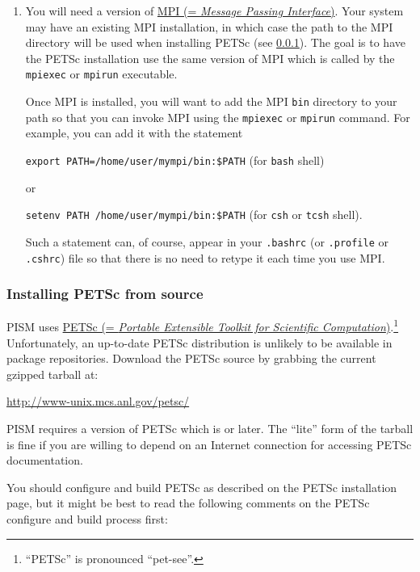 \documentclass[titlepage,letterpaper,final]{scrartcl}
\begin{document}
\begin{enumerate}
\item You will need a version of \href{http://www-unix.mcs.anl.gov/mpi/}{MPI (=
    \emph{Message Passing Interface})}. Your system may have an existing MPI installation, in which
  case the path to the MPI directory will be used when installing PETSc  (see \ref{subsec:prereq-petsc}).
  The goal is to have the PETSc installation use the
  same version of MPI which is called by the \texttt{mpiexec} or \texttt{mpirun}
  executable.

  Once MPI is installed, you will
  want to add the MPI \texttt{bin} directory to your path so that you can
  invoke MPI using the \texttt{mpiexec} or \texttt{mpirun} command. For
  example, you can add it with the statement

\texttt{export PATH=/home/user/mympi/bin:\$PATH}  \qquad (for \texttt{bash} shell)

\noindent or

\texttt{setenv PATH /home/user/mympi/bin:\$PATH}  \qquad (for \texttt{csh} or \texttt{tcsh} shell).

\noindent Such a statement can, of course, appear in your \texttt{.bashrc} (or
\texttt{.profile} or \texttt{.cshrc}) file so that there is no need to retype
it each time you use MPI.

\end{enumerate}


\subsubsection{Installing PETSc from source}
\label{subsec:prereq-petsc}
  
PISM uses \href{http://www-unix.mcs.anl.gov/petsc/}{PETSc (=
    \emph{Portable Extensible Toolkit for Scientific
      Computation})}.\footnote{``PETSc''
  is pronounced ``pet-see''.}  Unfortunately, an up-to-date PETSc distribution
  is unlikely to be available in package repositories.  Download the PETSc
  source by grabbing the current gzipped tarball at:
\begin{center}
    \url{http://www-unix.mcs.anl.gov/petsc/}
\end{center}
PISM requires a version of PETSc which is \texttt{\PETSCREL} or later. The
``lite'' form of the tarball is fine if you are willing to depend on an Internet
connection for accessing PETSc documentation.

You should configure and build PETSc as described on the
PETSc installation page, but it might be best to read the following comments on
the PETSc configure and build process first:
\end{document}
